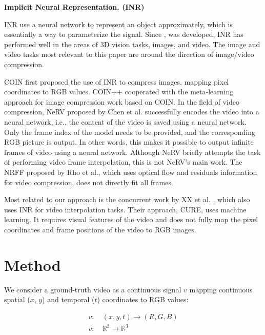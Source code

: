 \documentclass{article}
\begin{document}
\textbf{ Implicit Neural Representation. (INR)}

INR use a neural network to represent an object approximately, which is essentially a way to parameterize the signal.
Since \cite{mildenhall2020nerf}, \cite{sitzmann2020implicit} was developed, INR has performed well in the areas of 3D vision tasks, images, and video.
The image and video tasks most relevant to this paper are around the direction of image/video compression.

COIN \cite{dupont2021coin} first proposed the use of INR to compress images, mapping pixel coordinates to RGB values.
COIN++ \cite{dupont2022coin++} cooperated with the meta-learning approach for image compression work based on COIN.
In the field of video compression, NeRV \cite{chen2021nerv} proposed by Chen et al. successfully encodes the video into a neural network, i.e., the content of the video is saved using a neural network.
Only the frame index of the model needs to be provided, and the corresponding RGB picture is output.
In other words, this makes it possible to output infinite frames of video using a neural network.
Although NeRV briefly attempts the task of performing video frame interpolation, this is not NeRV's main work.
The NRFF \cite{rho2022neural} proposed by Rho et al., which uses optical flow and residuals information for video compression, does not directly fit all frames.

Most related to our approach is the concurrent work by XX et al. \cite{shangguan2022learning}, which also uses INR for video interpolation tasks.
Their approach, CURE, uses machine learning.
It requires visual features of the video and does not fully map the pixel coordinates and frame positions of the video to RGB images.


\section{Method}

We consider a ground-truth video as a continuous signal $v$ mapping continuous spatial ($x$, $y$) and temporal ($t$) coordinates to RGB values:

\begin{equation}
\begin{aligned}
v:& \: (x, y, t) \rightarrow (R, G, B) \\
v:& \: \mathbb{R}^3 \rightarrow \mathbb{R}^3
\end{aligned}
\end{equation}
\end{document}
